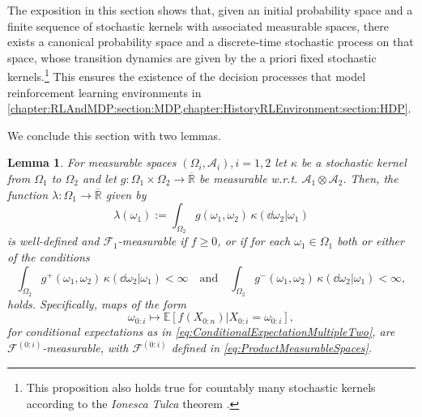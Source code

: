 \documentclass[
    a4paper,
    11pt,
    bibliography=totoc,
    listof=totoc,      
    headinclude=true,
    cleardoublepage=empty,
]{scrbook}
\theoremstyle{plain}
\newtheorem{lemma}[theorem]{Lemma}
\theoremstyle{definition}
\theoremstyle{remark}
\newcommand{\SetR}{\mathbb R}
\newcommand{\E}{\mathbb E}
\begin{document}
The exposition in this section shows that, given an initial probability space
and a finite sequence of stochastic kernels with associated measurable spaces,
there exists a canonical probability space and a discrete-time stochastic 
process on that space, whose transition dynamics are given by the a priori 
fixed stochastic kernels.\footnote{
    This proposition also holds true for countably many stochastic kernels
    according to the \textit{Ionesca Tulca} theorem 
    \cite[Theorem~14.35]{klenke2020_ptcc}.
}
This ensures the existence of the decision processes that model reinforcement 
learning environments in 
\cref{chapter:RLAndMDP:section:MDP,chapter:HistoryRLEnvironment:section:HDP}.

We conclude this section with two lemmas.

\begin{lemma}
\label{lem:KernelsAuxiliaryMeasurableExpectation}
    For measurable spaces $(\Omega_i, \mathcal{A}_i), i=1,2$ let $\kappa$ be a
    stochastic kernel from $\Omega_1$ to $\Omega_2$ and let $g:\Omega_1 \times
    \Omega_2 \to \overline{\SetR}$ be measurable w.r.t. $\mathcal{A}_1 \otimes
    \mathcal{A}_2$. Then, the function
    $\lambda:\Omega_1 \to \overline{\SetR}$ given by 
    \begin{equation}
    \label{eq:KernelIntFunction}
        \lambda(\omega_1) 
        := \int_{\Omega_2} 
            g(\omega_1, \omega_2) \, \kappa(\dd{\omega_2}|\omega_1)
    \end{equation}
    is well-defined and $\mathcal{F}_1$-measurable if $f\geq 0$, or if for
    each $\omega_1\in\Omega_1$ both or either of the conditions
    \begin{equation}     
    \label{eq:Case2Conditions}
        \int_{\Omega_2} g^+(\omega_1,\omega_2) \, 
            \kappa(\dd{\omega_2|\omega_1}) < \infty
        \quad \text{and} \quad
        \int_{\Omega_2} g^-(\omega_1,\omega_2) \,
            \kappa(\dd{\omega_2|\omega_1}) < \infty,
    \end{equation}
    holds. Specifically, maps of the form 
    \begin{equation}
    \label{eq:MeasurabilityCondExpectation}
        \omega_{0:i} \mapsto \E[f(X_{0:n}) | X_{0:i} = \omega_{0:i}],
    \end{equation}
    for conditional expectations as in 
    \cref{eq:ConditionalExpectationMultipleTwo}, are 
    $\mathcal{F}^{(0:i)}$-measurable, with $\mathcal{F}^{(0:i)}$ defined in 
    \cref{eq:ProductMeasurableSpaces}.
\end{lemma}
\end{document}
